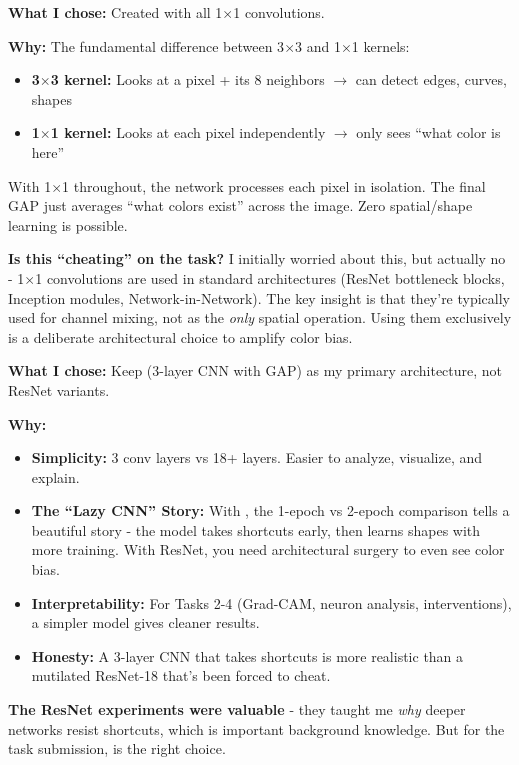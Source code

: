 \documentclass[9pt,a4paper,twocolumn,twoside]{tau-class/tau}
\begin{document}
        \begin{tauenv}[frametitle=Decision: Use 1$\times$1 Kernels to Eliminate Spatial Bias]
            \textbf{What I chose:} Created  with all 1$\times$1 convolutions.

            \textbf{Why:} The fundamental difference between 3$\times$3 and 1$\times$1 kernels:
            \begin{itemize}
                \item \textbf{3$\times$3 kernel:} Looks at a pixel + its 8 neighbors $\rightarrow$ can detect edges, curves, shapes
                \item \textbf{1$\times$1 kernel:} Looks at each pixel independently $\rightarrow$ only sees ``what color is here''
            \end{itemize}

            With 1$\times$1 throughout, the network processes each pixel in isolation. The final GAP just averages ``what colors exist'' across the image. Zero spatial/shape learning is possible.

            \textbf{Is this ``cheating'' on the task?} I initially worried about this, but actually no - 1$\times$1 convolutions are used in standard architectures (ResNet bottleneck blocks, Inception modules, Network-in-Network). The key insight is that they're typically used for channel mixing, not as the \textit{only} spatial operation. Using them exclusively is a deliberate architectural choice to amplify color bias.
        \end{tauenv}

        \begin{tauenv}[frametitle={Decision: Stick with SimpleGAPCNN Over ResNet}]
            \textbf{What I chose:} Keep  (3-layer CNN with GAP) as my primary architecture, not ResNet variants.

            \textbf{Why:}
            \begin{itemize}
                \item \textbf{Simplicity:} 3 conv layers vs 18+ layers. Easier to analyze, visualize, and explain.
                \item \textbf{The ``Lazy CNN'' Story:} With , the 1-epoch vs 2-epoch comparison tells a beautiful story - the model takes shortcuts early, then learns shapes with more training. With ResNet, you need architectural surgery to even see color bias.
                \item \textbf{Interpretability:} For Tasks 2-4 (Grad-CAM, neuron analysis, interventions), a simpler model gives cleaner results.
                \item \textbf{Honesty:} A 3-layer CNN that takes shortcuts is more realistic than a mutilated ResNet-18 that's been forced to cheat.
            \end{itemize}

            \textbf{The ResNet experiments were valuable} - they taught me \textit{why} deeper networks resist shortcuts, which is important background knowledge. But for the task submission,  is the right choice.
        \end{tauenv}
\end{document}
